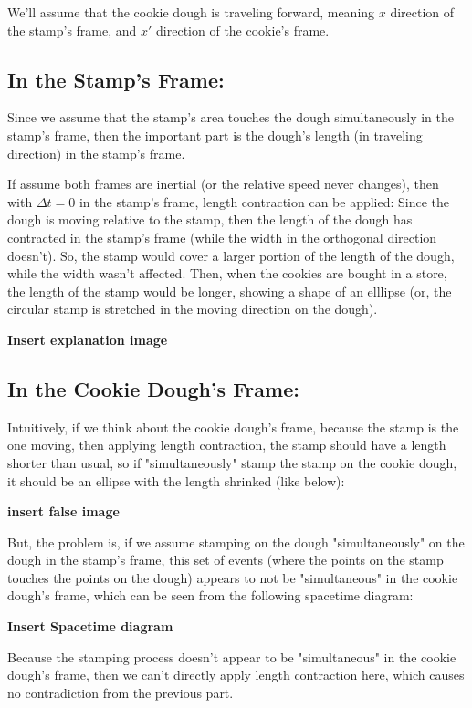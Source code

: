 \documentclass{article}
\begin{document}
We'll assume that the cookie dough is traveling forward, meaning $x$ direction of the stamp's frame, and $x'$ direction of the cookie's frame.

\subsection*{In the Stamp's Frame:}
Since we assume that the stamp's area touches the dough simultaneously in the stamp's frame, then the important part is the dough's length (in traveling direction) in the stamp's frame. 

If assume both frames are inertial (or the relative speed never changes), then with $\Delta t=0$ in the stamp's frame, length contraction can be applied: Since the dough is moving relative to the stamp, then the length of the dough has contracted in the stamp's frame (while the width in the orthogonal direction doesn't). So, the stamp would cover a larger portion of the length of the dough, while the width wasn't affected. Then, when the cookies are bought in a store, the length of the stamp would be longer, showing a shape of an elllipse (or, the circular stamp is stretched in the moving direction on the dough).

\textbf{Insert explanation image}

\subsection*{In the Cookie Dough's Frame:}
Intuitively, if we think about the cookie dough's frame, because the stamp is the one moving, then applying length contraction, the stamp should have a length shorter than usual, so if "simultaneously" stamp the stamp on the cookie dough, it should be an ellipse with the length shrinked (like below):

\textbf{insert false image}

But, the problem is, if we assume stamping on the dough "simultaneously" on the dough in the stamp's frame, this set of events (where the points on the stamp touches the points on the dough) appears to not be "simultaneous" in the cookie dough's frame, which can be seen from the following spacetime diagram:

\textbf{Insert Spacetime diagram}

Because the stamping process doesn't appear to be "simultaneous" in the cookie dough's frame, then we can't directly apply length contraction here, which causes no contradiction from the previous part.
\end{document}

